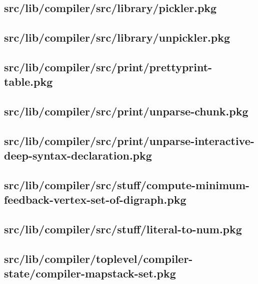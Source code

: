 \subsection{src/lib/compiler/src/library/pickler.pkg}


\subsection{src/lib/compiler/src/library/unpickler.pkg}


\subsection{src/lib/compiler/src/print/prettyprint-table.pkg}


\subsection{src/lib/compiler/src/print/unparse-chunk.pkg}


\subsection{src/lib/compiler/src/print/unparse-interactive-deep-syntax-declaration.pkg}


\subsection{src/lib/compiler/src/stuff/compute-minimum-feedback-vertex-set-of-digraph.pkg}


\subsection{src/lib/compiler/src/stuff/literal-to-num.pkg}


\subsection{src/lib/compiler/toplevel/compiler-state/compiler-mapstack-set.pkg}


